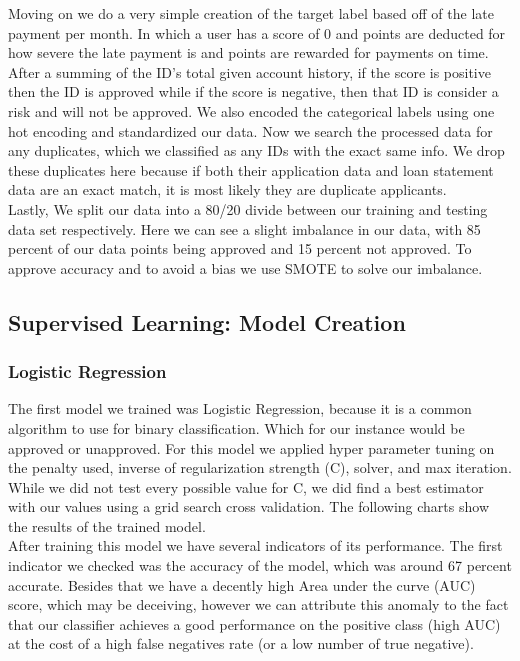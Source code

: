 \documentclass[12pt]{article}
\begin{document}
\noindent Moving on we do a very simple creation of the target label based off of the late payment per month. In which a user has a score of 0 and points are deducted for how severe the late payment is and points are rewarded for payments on time. After a summing of the ID's total given account history, if the score is positive then the ID is approved while if the score is negative, then that ID is consider a risk and will not be approved. We also encoded the categorical labels using one hot encoding and standardized our data. Now we search the processed data for any duplicates, which we classified as any IDs with the exact same info. We drop these duplicates here because if both their application data and loan statement data are an exact match, it is most likely they are duplicate applicants.\\

\noindent Lastly, We split our data into a 80/20 divide between our training and testing data set respectively. Here we can see a slight imbalance in our data, with 85 percent of our data points being approved and 15 percent not approved. To approve accuracy and to avoid a bias we use SMOTE to solve our imbalance.\\

\subsection{Supervised Learning: Model Creation}

\subsubsection{Logistic Regression}

\noindent The first model we trained was Logistic Regression, because it is a common algorithm to use for binary classification. Which for our instance would be approved or unapproved. For this model we applied hyper parameter tuning on the penalty used, inverse of regularization strength (C), solver, and max iteration. While we did not test every possible value for C, we did find a best estimator with our values using a grid search cross validation. The following charts show the results of the trained model.\\

\noindent After training this model we have several indicators of its performance. The first indicator we checked was the accuracy of the model, which was around 67 percent accurate. Besides that we have a decently high Area under the curve (AUC) score, which may be deceiving, however we can attribute this anomaly to the fact that our classifier achieves a good performance on the positive class (high AUC) at the cost of a high false negatives rate (or a low number of true negative). \\
\end{document}
